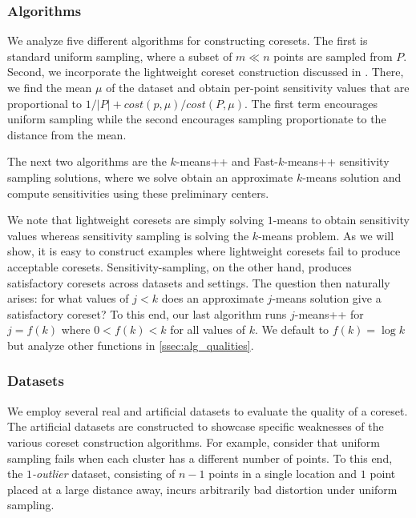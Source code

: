 
\subsubsection{Algorithms}

We analyze five different algorithms for constructing coresets. The first is standard uniform sampling, where a subset of $m \ll n$ points are sampled from $P$.
Second, we incorporate the lightweight coreset construction discussed in \cite{lightweight_coresets}. There, we find the mean $\mu$ of the dataset and obtain
per-point sensitivity values that are proportional to $1/|P| + cost(p, \mu) / cost(P, \mu)$. The first term encourages uniform sampling while the second
encourages sampling proportionate to the distance from the mean.

The next two algorithms are the $k$-means++ and Fast-$k$-means++ sensitivity sampling solutions, where we solve obtain an approximate $k$-means solution and
compute sensitivities using these preliminary centers.

We note that lightweight coresets are simply solving $1$-means to obtain sensitivity values whereas sensitivity sampling is solving the $k$-means problem.  As
we will show, it is easy to construct examples where lightweight coresets fail to produce acceptable coresets. Sensitivity-sampling, on the other hand, produces
satisfactory coresets across datasets and settings. The question then naturally arises: for what values of $j < k$ does an approximate $j$-means solution give
a satisfactory coreset? To this end, our last algorithm runs $j$-means++ for $j = f(k)$ where $0 < f(k) < k$ for all values of $k$. We default to $f(k) = \log
k$ but analyze other functions in \ref{ssec:alg_qualities}.

\subsubsection{Datasets}

We employ several real and artificial datasets to evaluate the quality of a coreset.  The artificial datasets are constructed to showcase specific weaknesses of
the various coreset construction algorithms. For example, consider that uniform sampling fails when each cluster has a different number of points. To this end,
the \emph{$1$-outlier} dataset, consisting of $n-1$ points in a single location and $1$ point placed at a large distance away, incurs arbitrarily bad distortion
under uniform sampling. 

